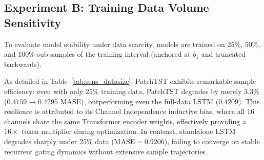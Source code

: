 \documentclass[11pt,a4paper]{article}
\begin{document}
\subsection{Experiment B: Training Data Volume Sensitivity}
To evaluate model stability under data scarcity, models are trained on $25\%$, $50\%$, and $100\%$ sub-samples of the training interval (anchored at $b_1$ and truncated backwards). 
\begin{table}[H]
\centering
\small
\caption{Training Data Volume Sensitivity on Electricity Demand ($L=48, H=24$).}
\label{tab:sens_datasize}
\end{table}
As detailed in Table~\ref{tab:sens_datasize}, PatchTST exhibits remarkable sample efficiency: even with only $25\%$ training data, PatchTST degrades by merely $3.3\%$ ($0.4159 \to 0.4295$ MASE), outperforming even the full-data LSTM ($0.4209$). This resilience is attributed to its Channel Independence inductive bias, where all 16 channels share the same Transformer encoder weights, effectively providing a $16\times$ token multiplier during optimization. In contrast, standalone LSTM degrades sharply under $25\%$ data ($\text{MASE}=0.9206$), failing to converge on stable recurrent gating dynamics without extensive sample trajectories.
\end{document}
